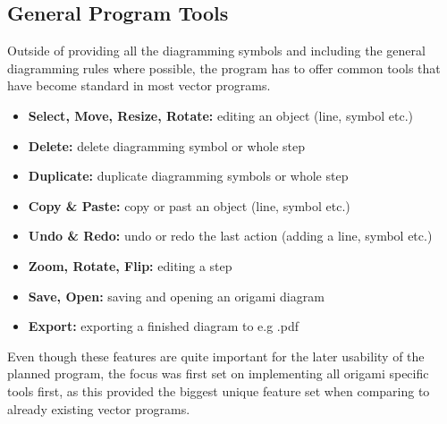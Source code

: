 \subsection{General Program Tools}

Outside of providing all the diagramming symbols and including the general diagramming rules where possible, the program has to offer common tools that have become standard in most vector programs.\\
\begin{itemize}
	\item \textbf{Select, Move, Resize, Rotate:} editing an object (line, symbol etc.)
	\item \textbf{Delete:} delete diagramming symbol or whole step
	\item \textbf{Duplicate:} duplicate diagramming symbols or whole step
	\item \textbf{Copy \& Paste:} copy or past an object (line, symbol etc.)
	\item \textbf{Undo \& Redo:} undo or redo the last action (adding a line, symbol etc.)
	\item \textbf{Zoom, Rotate, Flip:} editing a step
	\item \textbf{Save, Open:} saving and opening an origami diagram
	\item \textbf{Export:} exporting a finished diagram to e.g .pdf
\end{itemize}
Even though these features are quite important for the later usability of the planned program, the focus was first set on implementing all origami specific tools first, as this provided the biggest unique feature set when comparing to already existing vector programs.